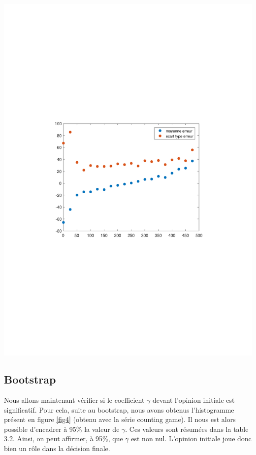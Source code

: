 \documentclass{scrreprt}
\begin{document}
\begin{center}
\includegraphics[trim = 3cm 9cm 3cm 9cm, clip]{residuMoyen.pdf}
\label{fig3}
\end{center}

\begin{multicols}{2}

\section{Bootstrap}

Nous allons maintenant vérifier si le coefficient $\gamma$ devant l'opinion initiale est significatif. Pour cela, suite au bootstrap, nous avons obtenus l'histogramme présent en figure \ref{fig4} (obtenu avec la série counting game). Il nous est alors possible d'encadrer à 95\% la valeur de $\gamma$. Ces valeurs sont résumées dans la table 3.2. Ainsi, on peut affirmer, à 95\%, que $\gamma$ est non nul. L'opinion initiale joue donc bien un rôle dans la décision finale.

\end{multicols}
\end{document}
